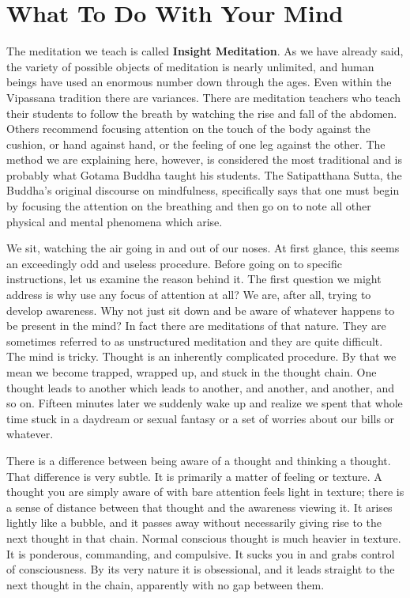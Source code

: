 \chapter{What To Do With Your Mind} The meditation we teach is called \textbf{Insight
Meditation}. As we have already said, the variety of possible objects of
meditation is nearly unlimited, and human beings have used an enormous number
down through the ages. Even within the Vipassana tradition there are variances.
There are meditation teachers who teach their students to follow the breath by
watching the rise and fall of the abdomen. Others recommend focusing attention
on the touch of the body against the cushion, or hand against hand, or the
feeling of one leg against the other. The method we are explaining here,
however, is considered the most traditional and is probably what Gotama Buddha
taught his students. The Satipatthana Sutta, the Buddha's original discourse on
mindfulness, specifically says that one must begin by focusing the attention on
the breathing and then go on to note all other physical and mental phenomena
which arise.

We sit, watching the air going in and out of our noses. At first glance, this
seems an exceedingly odd and useless procedure.  Before going on to specific
instructions, let us examine the reason behind it. The first question we might
address is why use any focus of attention at all? We are, after all, trying to
develop awareness. Why not just sit down and be aware of whatever happens to be
present in the mind? In fact there are meditations of that nature. They are
sometimes referred to as unstructured meditation and they are quite difficult.
The mind is tricky. Thought is an inherently complicated procedure. By that we
mean we become trapped, wrapped up, and stuck in the thought chain. One thought
leads to another which leads to another, and another, and another, and so on.
Fifteen minutes later we suddenly wake up and realize we spent that whole time
stuck in a daydream or sexual fantasy or a set of worries about our bills or
whatever.

There is a difference between being aware of a thought and thinking a thought.
That difference is very subtle. It is primarily a matter of feeling or texture.
A thought you are simply aware of with bare attention feels light in texture;
there is a sense of distance between that thought and the awareness viewing it.
It arises lightly like a bubble, and it passes away without necessarily giving
rise to the next thought in that chain. Normal conscious thought is much heavier
in texture. It is ponderous, commanding, and compulsive. It sucks you in and
grabs control of consciousness. By its very nature it is obsessional, and it
leads straight to the next thought in the chain, apparently with no gap between
them.

